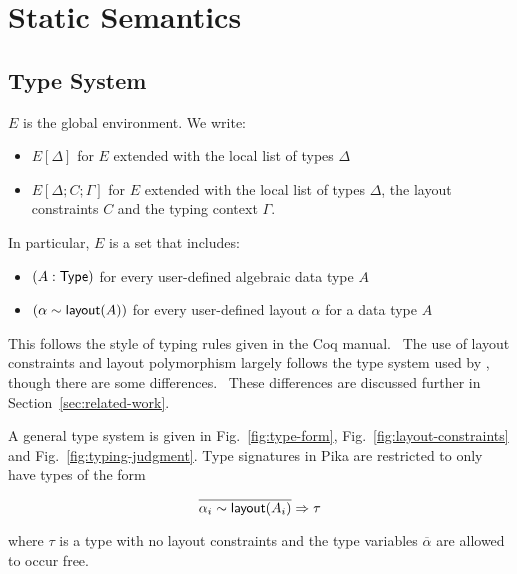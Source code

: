\section{Static Semantics}

\subsection{Type System}

$E$ is the global environment. We write:

\begin{itemize}
  \item $E[\Delta]$ for $E$ extended with the local list of types $\Delta$
  \item $E[\Delta;C;\Gamma]$ for $E$ extended with the local list of types $\Delta$, the
    layout constraints $C$ and the typing context $\Gamma$.
\end{itemize}

\noindent
In particular, $E$ is a set that includes:
\begin{itemize}
  \item $(A : \textsf{Type})$ for every user-defined algebraic data type $A$
  \item $(\alpha \sim \textsf{layout}(A))$ for every user-defined layout $\alpha$ for a data type $A$
\end{itemize}

\noindent
This follows the style of typing rules given in the Coq manual.~\cite{Coq-typing-rules} The use of layout constraints and layout
polymorphism largely follows the type system used by \Dargent, though there are some differences.~\cite{Dargent} These differences
are discussed further in Section~\ref{sec:related-work}.

A general type system is given in Fig.~\ref{fig:type-form}, Fig.~\ref{fig:layout-constraints} and Fig.~\ref{fig:typing-judgment}. Type signatures
in Pika are restricted to only have types of the form

\[
  \overline{\alpha_i \sim \textsf{layout}(A_i)} \Rightarrow \tau
\]

\noindent
where $\tau$ is a type with no layout constraints and the type variables $\overline{\alpha}$ are allowed to occur free.

